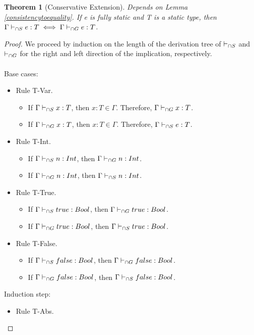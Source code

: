 \documentclass[a4paper]{article}
\newtheorem{theorem}{Theorem}
\begin{document}
\begin{theorem}[Conservative Extension]
\label{conservative_extension_typesystem}
Depends on Lemma \ref{consistencytoequality}.
If e is fully static and T is a static type, then $\Gamma \vdash_{\cap S} e : T \iff \Gamma \vdash_{\cap G} e : T$.
\end{theorem}
\begin{proof}
We proceed by induction on the length of the derivation tree of $\vdash_{\cap S}$ and $\vdash_{\cap G}$ for the right and left direction of the implication, respectively.\\\\
Base cases:
\begin{itemize}
    \item Rule T-Var.
    \begin{itemize}
        \item If $\Gamma \vdash_{\cap S} x : T$, then $x : T \in \Gamma$.
        Therefore, $\Gamma \vdash_{\cap G} x : T$.
        \item If $\Gamma \vdash_{\cap G} x : T$, then $x : T \in \Gamma$.
        Therefore, $\Gamma \vdash_{\cap S} e : T$.
    \end{itemize}
    \item Rule T-Int.
    \begin{itemize}
        \item If $\Gamma \vdash_{\cap S} n : {Int}$, then $\Gamma \vdash_{\cap G} n : {Int}$.
        \item If $\Gamma \vdash_{\cap G} n : {Int}$, then $\Gamma \vdash_{\cap S} n : {Int}$.
    \end{itemize}
    \item Rule T-True.
    \begin{itemize}
        \item If $\Gamma \vdash_{\cap S} true : Bool$, then $\Gamma \vdash_{\cap G} true : Bool$.
        \item If $\Gamma \vdash_{\cap G} true : Bool$, then $\Gamma \vdash_{\cap S} true : Bool$.
    \end{itemize}
    \item Rule T-False.
    \begin{itemize}
        \item If $\Gamma \vdash_{\cap S} false : Bool$, then $\Gamma \vdash_{\cap G} false : Bool$.
        \item If $\Gamma \vdash_{\cap G} false : Bool$, then $\Gamma \vdash_{\cap S} false : Bool$.
    \end{itemize}
\end{itemize}
Induction step:
\begin{itemize}
    \item Rule T-Abs.
    \begin{itemize}

\end{itemize}
\end{itemize}
\end{proof}
\end{document}
